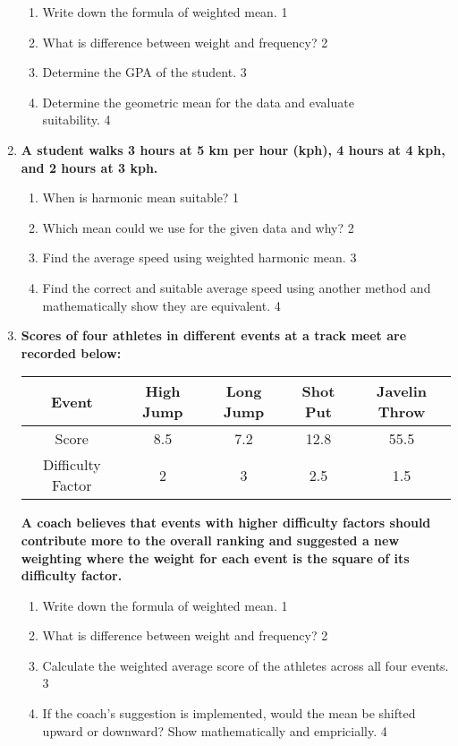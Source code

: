 \documentclass[a4paper,oneside]{book}
\begin{document}
\begin{enumerate}
  \begin{enumerate}
    \item
	Write down the formula of weighted mean. \hfill 1
    \item
	What is difference between weight and frequency? \hfill 2
    \item  
	Determine the GPA of the student. \hfill 3
    \item
	Determine the geometric mean for the data and evaluate \\ suitability. \hfill 4
  \end{enumerate}

 \item
	  \textbf{A student walks 3 hours at 5 km per hour (kph), 4 hours at 4 kph, and 2 hours at 3 kph.} 
  
  \begin{enumerate}
    \item
	When is harmonic mean suitable? \hfill 1
    \item
	Which mean could we use for the given data and why? \hfill 2
    \item  
	Find the average speed using weighted harmonic mean. \hfill 3
    \item
	Find the correct and suitable average speed using another method and mathematically show they are equivalent. \hfill 4
  \end{enumerate}
  
  \item
    \textbf{Scores of four athletes in different events at a track meet are recorded below:}

\begin{table}[h]
\centering
\begin{tabular}{c|c|c|c|c}
\hline
Event & High Jump & Long Jump & Shot Put & Javelin Throw \\ \hline
Score & 8.5 & 7.2 & 12.8 & 55.5 \\ \hline
Difficulty Factor & 2 & 3 & 2.5 & 1.5 \\ \hline
\end{tabular}
\end{table}

\textbf{A coach believes that events with higher difficulty factors should contribute more to the overall ranking and suggested a new weighting where the weight for each event is the square of its difficulty factor.}

  \begin{enumerate}
    \item
	Write down the formula of weighted mean. \hfill 1
    \item
	What is difference between weight and frequency? \hfill 2
	 \item Calculate the weighted average score of the athletes across all four events. \hfill 3
    \item If the coach's suggestion is implemented, would the mean be shifted upward or downward? Show mathematically and empricially. \hfill 4
  \end{enumerate}
  

\end{enumerate}
\end{document}
